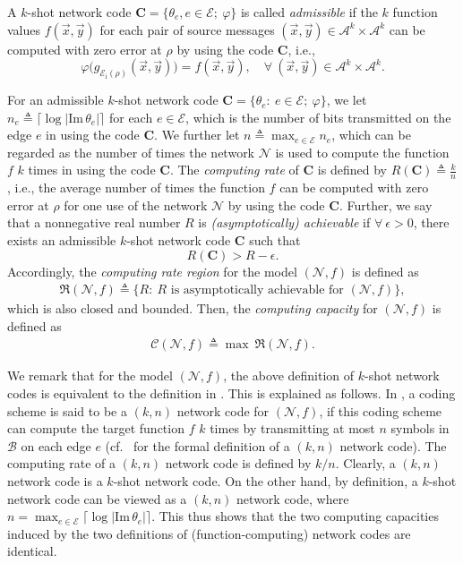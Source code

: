\documentclass[11pt,draftclsnofoot,onecolumn]{IEEEtran}
\makeatletter
\newcommand{\Rmnum}[1]{\expandafter\@slowromancap\romannumeral #1@}
\newcommand{\ein}{\mathcal{E}_{\mathrm{i}}}
\newcommand{\mA}{\mathcal{A}}
\newcommand{\mN}{\mathcal{N}}
\newcommand{\mE}{\mathcal{E}}
\newcommand{\mC}{\mathcal{C}}
\newcommand{\mbC}{\mathbf{C}}
\def\Im{\mathrm{Im}}
\makeatother
\begin{document}
{A $k$-shot network code $\mbC=\big\{\theta_e,e\in\mathcal{E};~\varphi\big\}$ is called {\em admissible} if the $k$ function values $f(\vec{x},\vec{y})$ for each pair of source messages $(\vec{x},\vec{y})\in\mA^k\times\mA^k$ can be computed with zero error at $\rho$ by using the code $\mbC$, i.e.,
\begin{equation}\label{def:decod-fun-zero-error}
\varphi\big(g_{\ein(\rho)}(\vec{x},\vec{y})\big)=f(\vec{x},\vec{y}),\quad\forall~(\vec{x},\vec{y}) \in \mA^k\times\mA^k.\nonumber
\end{equation}

For an admissible $k$-shot network code $\mbC=\big\{\theta_{e}:~e\in \mE;~\varphi \big\}$,
 we let $n_e\triangleq\big\lceil\log|\Im\,\theta_{e}|\big\rceil$ for each $e\in\mathcal{E}$, which is the number of bits transmitted on the edge $e$  in using the code $\mbC$. We further let
$n\triangleq \max_{e\in\mathcal{E}}n_e$, which can be regarded as the number of times the network $\mN$ is used to compute the function $f$ $k$ times in using the code $\mbC$. The {\em computing rate} of $\mbC$ is defined by $R(\mbC)\triangleq\frac{k}{n}$, i.e., the average number of times the function $f$ can be computed with zero error at $\rho$ for one use of the network $\mN$ by using the code $\mbC$.  Further, we say that a nonnegative real number $R$ is {\em (asymptotically) achievable} if $\forall~\epsilon > 0$, there exists an admissible $k$-shot network code $\mbC$ such that
$$R(\mbC) > R-\epsilon.$$
 Accordingly, the {\em computing rate region} for the  model $(\mN,f)$ is defined as
\begin{align}%
\mathfrak{R}(\mN,f) \triangleq \Big\{ R:~R \text{ is asymptotically achievable for $(\mN,f)$} \Big\},\nonumber
\end{align}
which is also closed and bounded. Then, the {\em computing capacity} for $(\mN, f)$ is defined as
\begin{align}%
\mC(\mN,f)\triangleq  \max~\mathfrak{R}(\mN, f).\nonumber
\end{align}

We remark that for the model $(\mathcal{N},f)$, the above definition of $k$-shot network codes is equivalent to the definition  in  \cite{Guang_Improved_upper_bound}. This is explained as follows. In \cite{Guang_Improved_upper_bound},  a coding scheme is said to be a $(k,n)$ network code for $(\mathcal{N},f)$, if this coding scheme can compute the target function $f$ $k$ times by transmitting at most $n$ symbols in $\mathcal{B}$ on each edge $e$  (cf.~\cite[Section~\Rmnum{2}-A]{Guang_Improved_upper_bound} for
the formal definition of a $(k,n)$ network code). The computing rate of a $(k,n)$ network code is defined by $k/n$.
Clearly,  a $(k,n)$ network code is a $k$-shot network code. On the other hand, by definition, a $k$-shot network code can be viewed as a  $(k,n)$ network code, where $n=\max_{e\in\mathcal{E}}\big\lceil\log|\Im\,\theta_{e}|\big\rceil$. This thus shows  that the two computing capacities induced by the two definitions of (function-computing) network codes are identical.

}
\end{document}
